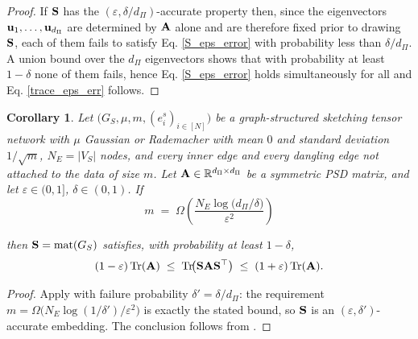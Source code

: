 \documentclass[11pt]{article}
\theoremstyle{plain}
\newtheorem{corollary}[theorem]{Corollary}
\theoremstyle{definition}
\theoremstyle{remark}
\begin{document}
\begin{proof}
If $\mathbf{S}$ has the $(\varepsilon,\delta/d_{\Pi})$-accurate
property then, since the eigenvectors $\mathbf{\boldsymbol{u}}_1,\dots,\mathbf{\boldsymbol{u}}_{d_{\Pi}}$
are determined by $\mathbf{A}$ alone and are therefore fixed prior to drawing
$\mathbf{S}$, each of them fails to satisfy Eq. \eqref{S_eps_error} with
probability less than $\delta/d_{\Pi}$. A union bound over the $d_{\Pi}$
eigenvectors shows that with probability at least $1-\delta$ none of them
fails, hence Eq. \eqref{S_eps_error} holds simultaneously for all and Eq.
\eqref{trace_eps_err} follows.
\end{proof}

\begin{corollary}\label{cor:k1-gaussian}
\leanok
{}
Let $\bigl(G_S,\mu,m,(e_i^{s})_{i\in[N]}\bigr)$ be a graph-structured
sketching tensor network with $\mu$ Gaussian or Rademacher with mean $0$ and standard deviation $1/\sqrt{m}$, $N_E=|V_S|$
nodes, and every inner edge and every dangling edge not attached to the
data of size $m$. Let $\mathbf{A}\in\mathbb{R}^{d_{\Pi}\times d_{\Pi}}$ be a symmetric
PSD matrix, and let $\varepsilon\in(0,1]$, $\delta\in(0,1)$. If
\[
  m\;=\;\Omega\!\left(\frac{N_E\log\!\bigl(d_{\Pi}/\delta\bigr)}{\varepsilon^{2}}\right)
\]

then $\mathbf{S}=\mathrm{mat}(G_S)$ satisfies, with probability at least
$1-\delta$,
\[
  (1-\varepsilon)\mathop{\mathrm{Tr}}(\mathbf{A})
  \;\le\;\mathop{\mathrm{Tr}}\!\bigl(\mathbf{S}\mathbf{A}\mathbf{S}^{\top}\bigr)
  \;\le\;(1+\varepsilon)\mathop{\mathrm{Tr}}(\mathbf{A}) .
\]
\end{corollary}

\begin{proof}
Apply  with failure probability $\delta'=\delta/d_{\Pi}$: the
requirement $m=\Omega\bigl(N_E\log(1/\delta')/\varepsilon^{2}\bigr)$ is exactly the
stated bound, so $\mathbf{S}$ is an $(\varepsilon,\delta')$-accurate embedding. The
conclusion follows from .
\end{proof}
\end{document}

